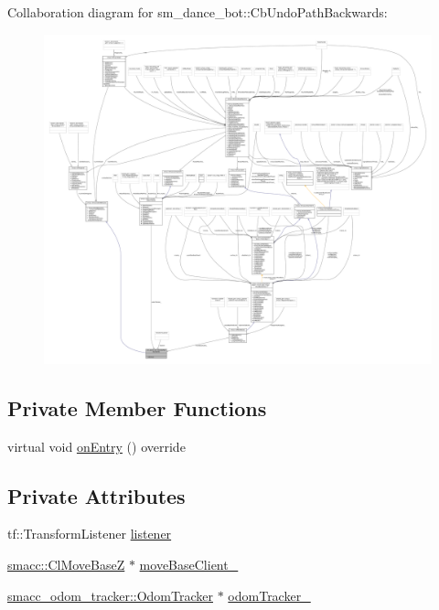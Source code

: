 Collaboration diagram for sm\+\_\+dance\+\_\+bot\+:\+:Cb\+Undo\+Path\+Backwards\+:
\nopagebreak
\begin{figure}[H]
\begin{center}
\leavevmode
\includegraphics[width=350pt]{classsm__dance__bot_1_1CbUndoPathBackwards__coll__graph}
\end{center}
\end{figure}
\subsection*{Private Member Functions}
\begin{DoxyCompactItemize}
\item 
virtual void \hyperlink{classsm__dance__bot_1_1CbUndoPathBackwards_a5ecdf83df96ab3d74eb4e4febea7fa74}{on\+Entry} () override
\end{DoxyCompactItemize}
\subsection*{Private Attributes}
\begin{DoxyCompactItemize}
\item 
tf\+::\+Transform\+Listener \hyperlink{classsm__dance__bot_1_1CbUndoPathBackwards_a35aa53997f49c33d11a43cca81a72dfd}{listener}
\item 
\hyperlink{classsmacc_1_1ClMoveBaseZ}{smacc\+::\+Cl\+Move\+BaseZ} $\ast$ \hyperlink{classsm__dance__bot_1_1CbUndoPathBackwards_af79da57bfb5ecd6b20af32e44d4b9ca9}{move\+Base\+Client\+\_\+}
\item 
\hyperlink{classsmacc__odom__tracker_1_1OdomTracker}{smacc\+\_\+odom\+\_\+tracker\+::\+Odom\+Tracker} $\ast$ \hyperlink{classsm__dance__bot_1_1CbUndoPathBackwards_a51cc8ec7a7e9da1f3cb4c1816b382af9}{odom\+Tracker\+\_\+}
\end{DoxyCompactItemize}
